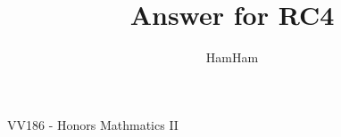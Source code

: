 \documentclass{beamer}
\title{\sffamily Answer for RC4}
\institute[UM-SJTU JI]{University of Michigan-Shanghai Jiao Tong University Joint Institute}
\author{HamHam}
\newcommand{\myfont}{\rmfamily\normalsize\upshape\mdseries}
\begin{document}
\begin{titlepage}
    \begin{center}
        VV186 - Honors Mathmatics II
    \end{center}
\end{titlepage}
\myfont
\end{document}
